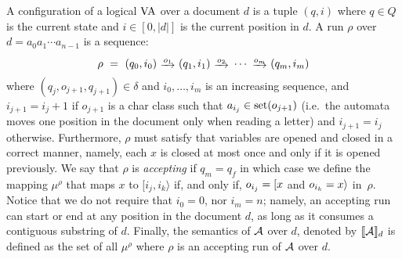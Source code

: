 A configuration of a logical $\mathrm{VA}$ over a document $d$ is a tuple $(q, i)$ where $q \in Q$ is the current state and \(i \in [0, |d|]\) is the current position in $d$.
A run $\rho$ over $d = a_0 a_1 \cdots a_{n-1}$ is a sequence:
$$
	\rho \ = \ (q_0, i_0) \ \trans{o_1} \ (q_1, i_1) \ \trans{o_2} \ \cdots \ \trans{o_m} \ (q_m, i_m)
$$
where $(q_j, o_{j+1}, q_{j+1}) \in \delta$ and $i_0, \ldots, i_m$ is an increasing sequence, and $i_{j+1} = i_j +1$ if $o_{j+1}$ is a char class such that $a_{i_j} \in \operatorname{set}(o_{j+1})$   (i.e.\ the automata moves one position in the document only when reading a letter) and $i_{j+1} = i_j$ otherwise. Furthermore, $\rho$ must satisfy that variables are opened and closed in a correct manner, namely, each $x$ is closed at most once and only if it is opened previously.
We say that $\rho$ is \emph{accepting} if $q_m = q_f$ in which case we define the mapping $\mu^{\rho}$ that maps $x$ to $[i_j, i_k\rangle$ if, and only if, $o_{i_j} = [ x$ and $o_{i_k} = x \rangle$ in~$\rho$. Notice that we do not require that $i_0 = 0$, nor $i_m=n$; namely, an accepting run can start or end at any position in the document $d$, as long as it consumes a contiguous substring of $d$.
Finally, the semantics of $\mathcal{A}$ over $d$, denoted by \(\llbracket\mathcal{A}\rrbracket_{d}\)
is defined as the set of all $\mu^{\rho}$ where $\rho$ is an accepting run of $\mathcal{A}$ over $d$.

